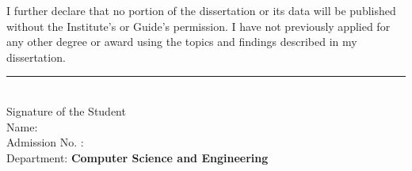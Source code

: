 \clearpage
\thispagestyle{empty}

\noindent
I further declare that no portion of the dissertation or its data will be published without the Institute’s or Guide’s permission. I have not previously applied for any other degree or award using the topics and findings described in my dissertation.

\vspace{2cm}

\noindent
\begin{minipage}[t]{0.75\textwidth}
    \rule{5.5cm}{0.6pt} \\
    Signature of the Student \\
    Name: \textbf{\myname} \\
    Admission No. : \textbf{\myrollno} \\
    Department: \textbf{Computer Science and Engineering} \\
\end{minipage}